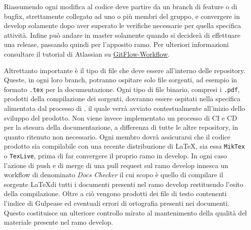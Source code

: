 Riassumendo ogni modifica al codice deve partire da un branch di feature o di bugfix, strettamente collegato ad uno o più membri del gruppo, e convergere in develop solamente dopo
aver superato le verifiche necessarie per quella specifica attività.
Infine può andare in master solamente quando si deciderà di effettuare una release, passando quindi per l'apposito ramo.
Per ulteriori informazioni consultare il tutorial di Atlassian su \href{https://www.atlassian.com/git/tutorials/comparing-workflows/gitflow-workflow}{GitFlow-Workflow}.

Altrettanto importante è il tipo di file che deve essere all'interno delle repository. Queste, in ogni loro branch, potranno ospitare solo file sorgenti, ad esempio
in formato \verb|.tex| per la documentazione. Ogni tipo di file binario, compresi i \verb|.pdf|, prodotti della compilazione dei sorgenti, dovranno essere
ospitati nella specifica \textit{} alimentata dal processo di \textit{}, il quale verrà avviato contestualmente
all'inizio dello sviluppo del prodotto. Non viene invece implementato un processo di CI e CD per la stesura della documentazione, a differenza di tutte le altre repository,
in quanto ritenuto non necessario. Ogni membro dovrà assicurarsi che il codice prodotto sia compilabile con una recente distribuzione di \LaTeX,
sia essa \verb|MikTex| o \verb|TexLive|, prima di far convergere il proprio ramo in develop. In ogni caso l'azione di push e di merge di una pull request sul ramo develop innesca un workflow di  denominato \textit{Docs Checker} il cui scopo è quello di compilare il sorgente \LaTeX di tutti i documenti presenti nel ramo develop restituendo l'esito della compilazione. Oltre a ciò vengono prodotti dei file di testo contenenti l'indice di Gulpease ed eventuali errori di ortografia presenti nei documenti. Questo costituisce un ulteriore controllo mirato al mantenimento della qualità del materiale presente nel ramo develop.
